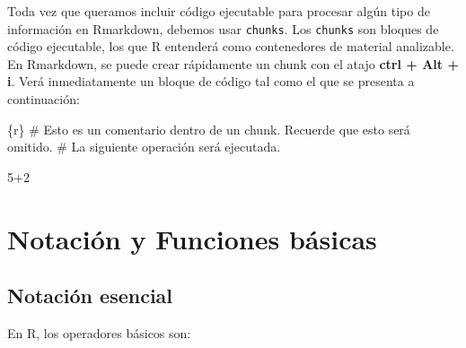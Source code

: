 \documentclass[
]{book}
\newenvironment{Shaded}{\begin{snugshade}}{\end{snugshade}}
\newcommand{\AttributeTok}[1]{\textcolor[rgb]{0.13,0.29,0.53}{#1}}
\newcommand{\StringTok}[1]{\textcolor[rgb]{0.31,0.60,0.02}{#1}}
\begin{document}
Toda vez que queramos incluir código ejecutable para procesar algún tipo de información en Rmarkdown, debemos usar \texttt{chunks}. Los \texttt{chunks} son bloques de código ejecutable, los que R entenderá como contenedores de material analizable. En Rmarkdown, se puede crear rápidamente un chunk con el atajo \textbf{ctrl + Alt + i}. Verá inmediatamente un bloque de código tal como el que se presenta a continuación:

\begin{Shaded}
\begin{Highlighting}[]
\StringTok{\textasciigrave{}\textasciigrave{}\textasciigrave{}}\AttributeTok{\{r\}}
\AttributeTok{\# Esto es un comentario dentro de un chunk. Recuerde que esto será omitido.}
\AttributeTok{\# La siguiente operación será ejecutada.}

\AttributeTok{5+2 }

\StringTok{\textasciigrave{}\textasciigrave{}\textasciigrave{}}
\end{Highlighting}
\end{Shaded}

\hypertarget{notacion-funciones}{%
\chapter{Notación y Funciones básicas}\label{notacion-funciones}}

\hypertarget{notaciuxf3n-esencial}{%
\section{Notación esencial}\label{notaciuxf3n-esencial}}

En R, los operadores básicos son:
\end{document}
